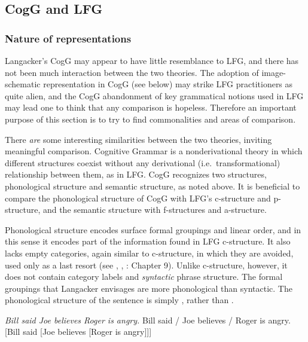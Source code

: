 \documentclass[output=paper,japanesefont,hidelinks]{langscibook}
\begin{document}
\subsection{CogG and LFG}
\label{sec:cg:3.2}

\subsubsection{Nature of representations}
\label{sec:cg:3.2.1}

Langacker's CogG may appear to have little resemblance to LFG, and there has not been much interaction between the two theories. The adoption of image-schematic representation in CogG (see below) may strike LFG practitioners as quite alien, and the CogG abandonment of key grammatical notions used in LFG may lead one to think that any comparison is hopeless. Therefore an important purpose of this section is to try to find commonalities and areas of comparison.

\hspace*{-1mm}There \textit{are} some interesting similarities between the two theories, inviting meaningful comparison. Cognitive Grammar is a nonderivational theory in which different structures coexist without any derivational (i.e.\ transformational) relationship between them, as in LFG. CogG recognizes two structures, phonological structure and semantic structure, as noted above. It is beneficial to compare the phonological structure of CogG with LFG's c-structure and p-structure, and the semantic structure with f-structures and a-structure.

Phonological structure encodes surface formal groupings and linear order, and in this sense it encodes part of the information found in LFG c-structure. It also lacks empty categories, again similar to c-structure, in which they are avoided, used only as a last resort (see \citealt{kaplzaen89}, \citealt{Bresnan1998}, \citealt{BresnanEtAl2016}: Chapter 9). Unlike c-structure, however, it does not contain category labels and \textit{syntactic} phrase structure. The formal groupings that Langacker envisages are more phonological than syntactic. The phonological structure of the sentence  is simply , rather than  \citep[79]{Langacker2003}.

\ea%
    \label{ex:cg:4}\begin{xlist}
  \ex\label{ex:cg:4a}\textit{Bill said Joe believes Roger is angry.}
  \ex\label{ex:cg:4b}{Bill said / Joe believes / Roger is angry.}
  \ex\label{ex:cg:4c}{[Bill said [Joe believes [Roger is angry]]]}
  \end{xlist}
   \z
\end{document}
